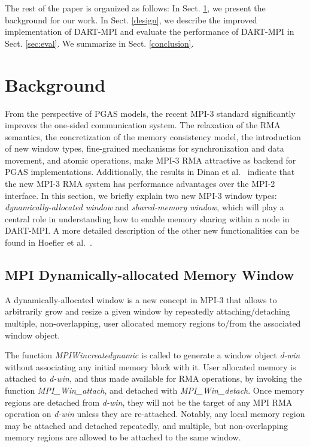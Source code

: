 \documentclass{llncs}
\newcommand{\todo}[1]{}
\newcommand{\MPI}[1]{\mbox{MPI-#1}\xspace}
\begin{document}
\todo{Rest of paragraph into discussion?!\\
This work has demonstrated
that the shared-memory functionality proposed in the \MPI3
benefits the \mbox{DART-MPI} intra-node blocking RMA operations. However, \mbox{DART-MPI} turns
to the MPI RMA operations for the non-blocking or inter-node scenario,
leading to low performance.}

The rest of the paper is organized as follows: In Sect. \ref{background}, we present the background for our work. In Sect. \ref{design},
we describe the improved implementation of \mbox{DART-MPI} and evaluate the performance of \mbox{DART-MPI} in Sect. \ref{sec:eval}. We summarize in Sect. \ref{conclusion}.

\section{Background}
\label{background}
From the perspective of PGAS models, the recent \MPI3 standard
\cite{mpi3} significantly improves the one-sided communication
system. The relaxation of the RMA semantics, the
concretization of the memory consistency model, the introduction of
new window types, fine-grained mechanisms for
synchronization and data movement, and atomic operations, make MPI-3 RMA attractive as backend for PGAS implementations. Additionally, the results
in Dinan et al.~\cite{Dinan} indicate that the new \MPI3 RMA system has
performance advantages over the \MPI2 interface.  In this section, we
briefly explain two new \MPI3 window types:
\emph{dynamically-allocated window} and \emph{shared-memory window},
which will play a central role in understanding how to enable memory sharing
within a node in \mbox{DART-MPI}.  A more detailed description
of the other new functionalities can be found in Hoefler et al.~\cite{Hoefler}.

\subsection{MPI Dynamically-allocated Memory Window}
A dynamically-allocated window is a new concept in \MPI3 that allows to
arbitrarily grow and resize a given window by repeatedly attaching/detaching multiple, 
non-overlapping, user allocated memory regions to/from the associated 
window object.

The function \textit{MPIWincreatedynamic} is called
to generate a window object \textit{d-win} without associating any
initial memory block with it. User allocated memory is attached to
\textit{d-win}, and thus made available for RMA operations, by
invoking the function \textit{MPI\_Win\_attach}, and detached with
\textit{MPI\_Win\_detach}.  Once memory regions are detached from
\textit{d-win}, they will not be the target of any MPI RMA operation
on \textit{d-win} unless they are re-attached. Notably, any local
memory region may be attached and detached repeatedly, and multiple,
but \mbox{non-overlapping} memory regions are allowed to be attached
to the same window. 
\end{document}
